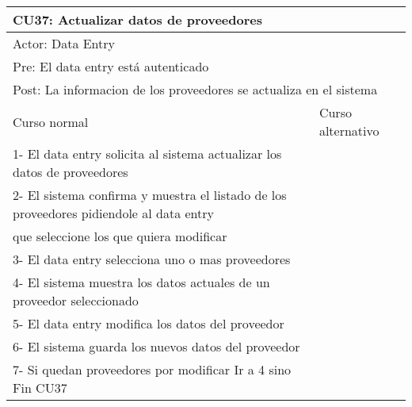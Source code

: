 \begin{table}[H]
  \begin{adjustbox}{max width = \textwidth}
  \begin{tabular}{|l|l|}
    \hline
    \multicolumn{2}{|l|}{CU37: Actualizar datos de proveedores} \\\hline
    \multicolumn{2}{|l|}{Actor: Data Entry} \\\hline
    \multicolumn{2}{|l|}{Pre: El data entry está autenticado} \\\hline
    \multicolumn{2}{|l|}{Post: La informacion de los proveedores se actualiza en el sistema} \\\hline
     Curso normal & Curso alternativo\\ \hline
	 1- El data entry solicita al sistema actualizar los datos de proveedores & \\ \hline
     2- El sistema confirma y muestra el listado de los proveedores pidiendole al data entry \\ que seleccione los que quiera modificar & \\ \hline
     3- El data entry selecciona uno o mas proveedores & \\ \hline
     4- El sistema muestra los datos actuales de un proveedor seleccionado & \\ \hline
     5- El data entry modifica los datos del proveedor & \\ \hline
     6- El sistema guarda los nuevos datos del proveedor & \\ \hline
     7- Si quedan proveedores por modificar Ir a 4 sino Fin CU37 & \\ \hline
  \end{tabular}
  \end{adjustbox}
\end{table}


